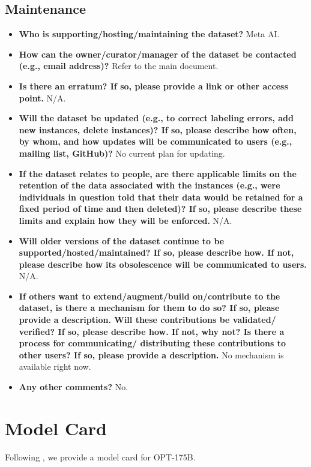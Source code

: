 \documentclass[11pt]{article}
\newcommand{\OPT}[0]{{OPT-175B}}
\begin{document}
\subsection{Maintenance}
\begin{itemize}
    \item \textbf{Who is supporting/hosting/maintaining the dataset?} Meta AI.
    \item \textbf{How can the owner/curator/manager of the dataset be contacted (e.g., email address)?} Refer to the main document.
    \item \textbf{Is there an erratum? If so, please provide a link or other access point.} N/A.
    \item \textbf{Will the dataset be updated (e.g., to correct labeling errors, add new instances, delete instances)? If so, please describe how often, by whom, and how updates will be communicated to users (e.g., mailing list, GitHub)?} No current plan for updating.
    \item \textbf{If the dataset relates to people, are there applicable limits on the retention of the data associated with the instances (e.g., were individuals in question told that their data would be retained for a fixed period of time and then deleted)? If so, please describe these limits and explain how they will be enforced.} N/A.
    \item \textbf{Will older versions of the dataset continue to be supported/hosted/maintained? If so, please describe how. If not, please describe how its obsolescence will be communicated to users.} N/A.
    \item \textbf{If others want to extend/augment/build on/contribute to the dataset, is there a mechanism for them to do so? If so, please provide a description. Will these contributions be validated/ verified? If so, please describe how. If not, why not? Is there a process for communicating/ distributing these contributions to other users? If so, please provide a description.} No mechanism is available right now.
    \item \textbf{Any other comments?} No.
\end{itemize}
\section{Model Card}
\label{sec:model_card}
Following \citet{DBLP:journals/corr/abs-1810-03993}, we provide a model card for \OPT{}. 
\end{document}
